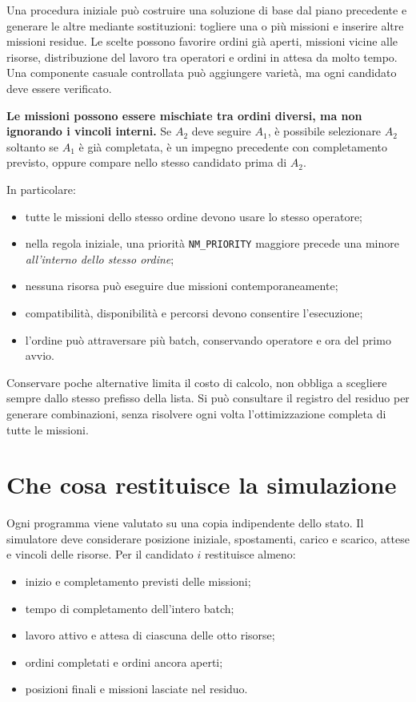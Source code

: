 \documentclass[a4paper,11pt]{article}
\begin{document}
Una procedura iniziale può costruire una soluzione di base dal piano precedente e generare le altre mediante sostituzioni: togliere una o più missioni e inserire altre missioni residue. Le scelte possono favorire ordini già aperti, missioni vicine alle risorse, distribuzione del lavoro tra operatori e ordini in attesa da molto tempo. Una componente casuale controllata può aggiungere varietà, ma ogni candidato deve essere verificato.

\textbf{Le missioni possono essere mischiate tra ordini diversi, ma non ignorando i vincoli interni.} Se $A_2$ deve seguire $A_1$, è possibile selezionare $A_2$ soltanto se $A_1$ è già completata, è un impegno precedente con completamento previsto, oppure compare nello stesso candidato prima di $A_2$.

In particolare:
\begin{itemize}
    \item tutte le missioni dello stesso ordine devono usare lo stesso operatore;
    \item nella regola iniziale, una priorità \texttt{NM\_PRIORITY} maggiore precede una minore \emph{all'interno dello stesso ordine};
    \item nessuna risorsa può eseguire due missioni contemporaneamente;
    \item compatibilità, disponibilità e percorsi devono consentire l'esecuzione;
    \item l'ordine può attraversare più batch, conservando operatore e ora del primo avvio.
\end{itemize}

Conservare poche alternative limita il costo di calcolo, non obbliga a scegliere sempre dallo stesso prefisso della lista. Si può consultare il registro del residuo per generare combinazioni, senza risolvere ogni volta l'ottimizzazione completa di tutte le missioni.

\section{Che cosa restituisce la simulazione}

Ogni programma viene valutato su una copia indipendente dello stato. Il simulatore deve considerare posizione iniziale, spostamenti, carico e scarico, attese e vincoli delle risorse. Per il candidato $i$ restituisce almeno:
\begin{itemize}
    \item inizio e completamento previsti delle missioni;
    \item tempo di completamento dell'intero batch;
    \item lavoro attivo e attesa di ciascuna delle otto risorse;
    \item ordini completati e ordini ancora aperti;
    \item posizioni finali e missioni lasciate nel residuo.
\end{itemize}
\end{document}
